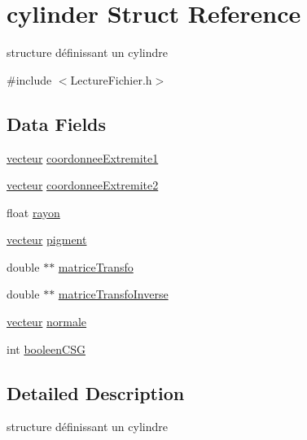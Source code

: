 \hypertarget{structcylinder}{
\section{cylinder Struct Reference}
\label{structcylinder}
}


structure définissant un cylindre  




{\ttfamily \#include $<$LectureFichier.h$>$}

\subsection*{Data Fields}
\begin{DoxyCompactItemize}
\item 
\hyperlink{structvecteur}{vecteur} \hyperlink{structcylinder_afb2be5d3ea17eb45de040c4ab9f15a38}{coordonneeExtremite1}
\item 
\hyperlink{structvecteur}{vecteur} \hyperlink{structcylinder_aa1d3b217682ad932e6211bfb18ebb259}{coordonneeExtremite2}
\item 
float \hyperlink{structcylinder_aa23f7a160698c954b6073da64f9bd3f0}{rayon}
\item 
\hyperlink{structvecteur}{vecteur} \hyperlink{structcylinder_a5a4ee24431a1811fa1c8b75844198987}{pigment}
\item 
double $\ast$$\ast$ \hyperlink{structcylinder_aa06ccc348007e3355beccf412f2f656c}{matriceTransfo}
\item 
double $\ast$$\ast$ \hyperlink{structcylinder_acd7a3590501dcccfaefccbb658f83821}{matriceTransfoInverse}
\item 
\hyperlink{structvecteur}{vecteur} \hyperlink{structcylinder_a944738f40a0294270a0047acc5a77ee2}{normale}
\item 
int \hyperlink{structcylinder_a4428e32d4383f7dee25e5a4cb192da24}{booleenCSG}
\end{DoxyCompactItemize}


\subsection{Detailed Description}
structure définissant un cylindre 

